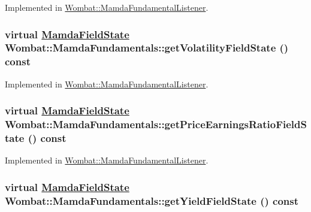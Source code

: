 Implemented in \hyperlink{classWombat_1_1MamdaFundamentalListener_fa468a5bdef49cfbd10ce80223058091}{Wombat::Mamda\-Fundamental\-Listener}.\hypertarget{classWombat_1_1MamdaFundamentals_e84cec28dfd0ea05f96bca760df88f8f}{
\subsubsection[getVolatilityFieldState]{\setlength{\rightskip}{0pt plus 5cm}virtual \hyperlink{namespaceWombat_93aac974f2ab713554fd12a1fa3b7d2a}{Mamda\-Field\-State} Wombat::Mamda\-Fundamentals::get\-Volatility\-Field\-State () const}}
\label{classWombat_1_1MamdaFundamentals_e84cec28dfd0ea05f96bca760df88f8f}




Implemented in \hyperlink{classWombat_1_1MamdaFundamentalListener_941388a4d6f212cec924cebf8d49933a}{Wombat::Mamda\-Fundamental\-Listener}.\hypertarget{classWombat_1_1MamdaFundamentals_41e962b3c691f2a355f1b66ccdc3a6a5}{
\subsubsection[getPriceEarningsRatioFieldState]{\setlength{\rightskip}{0pt plus 5cm}virtual \hyperlink{namespaceWombat_93aac974f2ab713554fd12a1fa3b7d2a}{Mamda\-Field\-State} Wombat::Mamda\-Fundamentals::get\-Price\-Earnings\-Ratio\-Field\-State () const}}
\label{classWombat_1_1MamdaFundamentals_41e962b3c691f2a355f1b66ccdc3a6a5}




Implemented in \hyperlink{classWombat_1_1MamdaFundamentalListener_39858ced30ea763c49091af7ef682d73}{Wombat::Mamda\-Fundamental\-Listener}.\hypertarget{classWombat_1_1MamdaFundamentals_6409ffd956002efafa3c8881891d0378}{
\subsubsection[getYieldFieldState]{\setlength{\rightskip}{0pt plus 5cm}virtual \hyperlink{namespaceWombat_93aac974f2ab713554fd12a1fa3b7d2a}{Mamda\-Field\-State} Wombat::Mamda\-Fundamentals::get\-Yield\-Field\-State () const}}
\label{classWombat_1_1MamdaFundamentals_6409ffd956002efafa3c8881891d0378}




